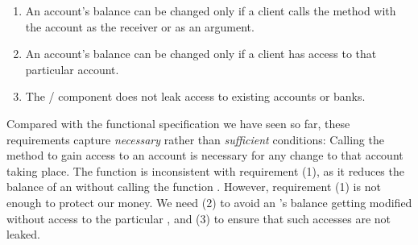 \begin{enumerate}
\item %
An account's
  balance can be changed only  if a client   calls the  method  with the
  account as the receiver or as an argument. 
\item An account's balance can be changed  only  if a client has
  access to that  particular account. %
\item The / component does not leak access to existing accounts or banks. 
\end{enumerate}

Compared with the functional specification we have seen so far, these
requirements %
capture \emph{necessary} %
rather than
\emph{sufficient} conditions:  Calling the 
method to gain access to an account %
is necessary for any change to that account taking place.
The  function 
 is inconsistent with requirement  (1), as it reduces the balance of an  without calling the
function . 
However, requirement  (1) is not enough to protect our money. We need (2) to avoid an 's balance getting
modified without access to the particular , and (3) to ensure that such accesses are not leaked. 


